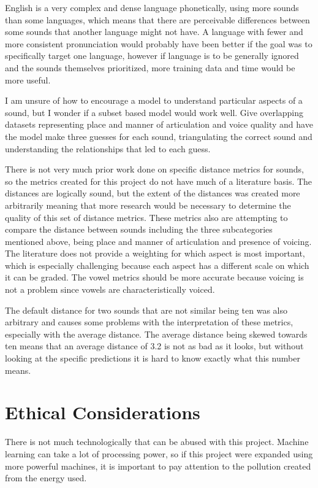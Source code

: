 \documentclass[10pt,twocolumn]{article}
\begin{document}
English is a very complex and dense language phonetically, using more sounds than some languages, which means that there are perceivable differences between some sounds that another language might not have. A language with fewer and more consistent pronunciation would probably have been better if the goal was to specifically target one language, however if language is to be generally ignored and the sounds themselves prioritized, more training data and time would be more useful. 



	

I am unsure of how to encourage a model to understand particular aspects of a sound, but I wonder if a subset based model would work well. Give overlapping datasets representing place and manner of articulation and voice quality and have the model make three guesses for each sound, triangulating the correct sound and understanding the relationships that led to each guess.

There is not very much prior work done on specific distance metrics for sounds, so the metrics created for this project do not have much of a literature basis. The distances are logically sound, but the extent of the distances was created more arbitrarily meaning that more research would be necessary to determine the quality of this set of distance metrics. These metrics also are attempting to compare the distance between sounds including the three subcategories mentioned above, being place and manner of articulation and presence of voicing. The literature does not provide a weighting for which aspect is most important, which is especially challenging because each aspect has a different scale on which it can be graded. The vowel metrics should be more accurate because voicing is not a problem since vowels are characteristically voiced. 

The default distance for two sounds that are not similar being ten was also arbitrary and causes some problems with the interpretation of these metrics, especially with the average distance. The average distance being skewed towards ten means that an average distance of 3.2 is not as bad as it looks, but without looking at the specific predictions it is hard to know exactly what this number means. 

\section{Ethical Considerations}

There is not much technologically that can be abused with this project. Machine learning can take a lot of processing power, so if this project were expanded using more powerful machines, it is important to pay attention to the pollution created from the energy used. 
\end{document}
